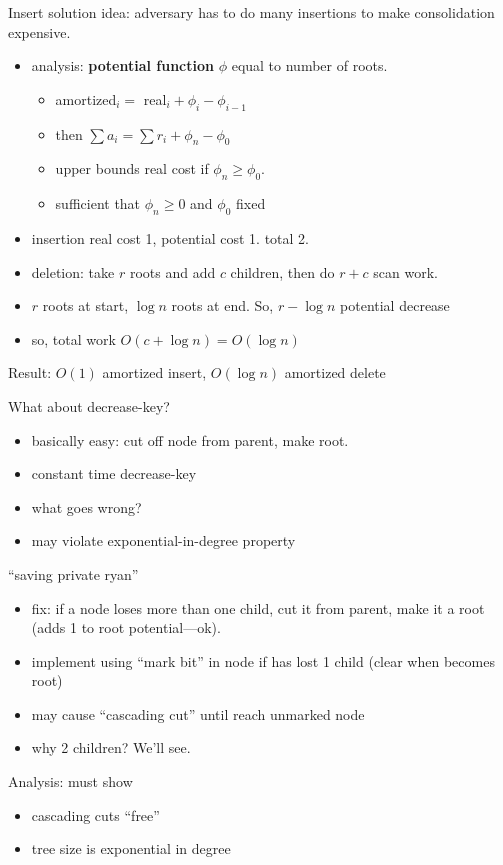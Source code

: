 \documentclass{article}
\begin{document}
Insert solution idea: adversary has to do many insertions to make consolidation expensive.
\begin{itemize}
\item analysis: \textbf{potential function} $\phi$ equal to number of roots.
\begin{itemize}
\item amortized$_i=$ real$_i+\phi_i-\phi_{i-1}$
\item then $\sum a_i=\sum r_i+\phi_n-\phi_0$
\item upper bounds real cost if $\phi_n \ge \phi_0$.
\item sufficient that $\phi_n \ge 0$ and $\phi_0$ fixed
\end{itemize}
\item insertion real cost 1, potential cost 1.  total 2.
\item deletion: take $r$ roots and add $c$ children, then do $r+c$ scan work.
\item $r$ roots at start, $\log n$ roots at end.  So, $r-\log n$ potential decrease
\item so, total work $O(c+\log n)=O(\log n)$
\end{itemize}
Result: $O(1)$ amortized insert, $O(\log n)$ amortized delete

What about decrease-key?
\begin{itemize}
\item basically easy: cut off node from parent, make root.
\item constant time decrease-key
\item what goes wrong?
\item may violate exponential-in-degree property
\end{itemize}

``saving private ryan''
\begin{itemize}
\item fix: if a node loses more than one child, cut it from parent,
  make it a root (adds 1 to root potential---ok). 
\item implement using ``mark bit'' in node if has lost 1 child (clear
  when becomes root)
\item may cause ``cascading cut'' until reach unmarked node
\item why 2 children?  We'll see.
\end{itemize}

Analysis: must show
\begin{itemize}
\item  cascading cuts ``free'' 
\item tree size is exponential in degree
\end{itemize}
\end{document}
